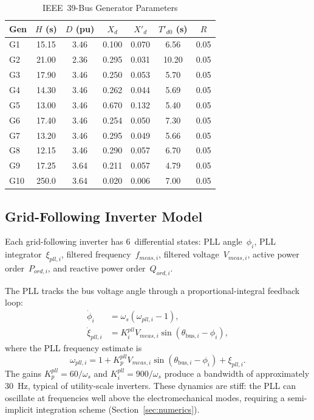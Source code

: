 \documentclass[11pt]{article}
\begin{document}
\begin{table}[t]
\centering
\caption{IEEE~39-Bus Generator Parameters}
\label{tab:sg_params}
\small
\begin{tabular}{@{}lcccccc@{}}
\toprule
Gen & $H$ (s) & $D$ (pu) & $X_d$ & $X'_d$ & $T'_{d0}$ (s) & $R$ \\
\midrule
G1  & 15.15 & 3.46 & 0.100 & 0.070 & 6.56  & 0.05 \\
G2  & 21.00 & 2.36 & 0.295 & 0.031 & 10.20 & 0.05 \\
G3  & 17.90 & 3.46 & 0.250 & 0.053 & 5.70  & 0.05 \\
G4  & 14.30 & 3.46 & 0.262 & 0.044 & 5.69  & 0.05 \\
G5  & 13.00 & 3.46 & 0.670 & 0.132 & 5.40  & 0.05 \\
G6  & 17.40 & 3.46 & 0.254 & 0.050 & 7.30  & 0.05 \\
G7  & 13.20 & 3.46 & 0.295 & 0.049 & 5.66  & 0.05 \\
G8  & 12.15 & 3.46 & 0.290 & 0.057 & 6.70  & 0.05 \\
G9  & 17.25 & 3.64 & 0.211 & 0.057 & 4.79  & 0.05 \\
G10 & 250.0 & 3.64 & 0.020 & 0.006 & 7.00  & 0.05 \\
\bottomrule
\end{tabular}
\end{table}


\subsection{Grid-Following Inverter Model}
\label{sec:gfl_model}

Each grid-following inverter has 6~differential states:
PLL angle~$\phi_i$, PLL integrator~$\xi_{pll,i}$, filtered
frequency~$f_{meas,i}$, filtered voltage~$V_{meas,i}$, active power
order~$P_{ord,i}$, and reactive power order~$Q_{ord,i}$.

The PLL tracks the bus voltage angle through a proportional-integral
feedback loop:
\begin{align}
  \dot{\phi}_i &= \omega_s(\omega_{pll,i} - 1), \label{eq:pll_phi} \\
  \dot{\xi}_{pll,i} &= K_i^{pll} V_{meas,i}
    \sin(\theta_{\mathrm{bus},i} - \phi_i), \label{eq:pll_xi}
\end{align}
where the PLL frequency estimate is
\begin{equation}
  \omega_{pll,i} = 1 + K_p^{pll} V_{meas,i}
    \sin(\theta_{\mathrm{bus},i} - \phi_i) + \xi_{pll,i}.
  \label{eq:pll_omega}
\end{equation}
The gains $K_p^{pll} = 60/\omega_s$ and $K_i^{pll} = 900/\omega_s$
produce a bandwidth of approximately 30~Hz, typical of
utility-scale inverters.  These dynamics are stiff: the PLL can
oscillate at frequencies well above the electromechanical modes,
requiring a semi-implicit integration scheme (Section~\ref{sec:numerics}).
\end{document}

